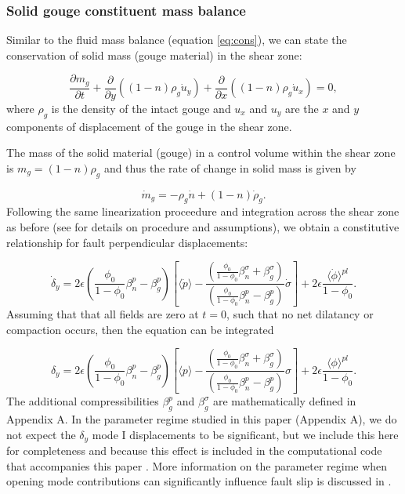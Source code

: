 \documentclass[draft]{agujournal2019}
\begin{document}
\subsubsection{Solid gouge constituent mass balance} \label{sec:solid}

Similar to the fluid mass balance (equation \ref{eq:cons}), we can state the conservation of solid mass (gouge material) in the shear zone:

\begin{equation}
    \frac{\partial m_g}{\partial t} + \frac{\partial}{\partial y} \left(  (1 - n) \rho_g \dot{u}_y \right) +  \frac{\partial}{\partial x} \left(  (1 - n) \rho_g \dot{u}_x \right) = 0,
    \label{eq:conssolid}
\end{equation}
where $\rho_g$ is the density of the intact gouge and $u_x$ and $u_y$ are the $x$ and $y$ components of displacement of the gouge in the shear zone.

The mass of the solid material (gouge) in a control volume within the shear zone is $m_g = (1-n)\rho_g$ and thus the rate of change in solid mass is given by

\begin{equation}
    \dot{m}_g =  - \rho_g \dot{n} + (1-n) \dot{\rho}_g.
\end{equation}
Following the same linearization proceedure and integration across the shear zone as before (see  for details on procedure and assumptions), we obtain a constitutive relationship for fault perpendicular displacements:

\begin{equation}
     \dot{\delta}_y =  2 \epsilon \left( \frac{ \phi_0 }{1 - \phi_0} \beta_n^p - \beta_g^p \right) \left[  \langle \dot{p} \rangle  - \frac{ \left( \frac{ \phi_0 }{1 - \phi_0} \beta_n^{\sigma}  +    \beta_g^\sigma \right)}{\left( \frac{ \phi_0 }{1 - \phi_0} \beta_n^p - \beta_g^p \right)} \dot{\sigma}  \right] + 2 \epsilon \frac{ \langle \dot{\phi} \rangle^{pl}}{1 - \phi_0}.
\end{equation}
Assuming that that all fields are zero at $t=0$, such that no net dilatancy or compaction occurs, then the equation can be integrated

\begin{equation}
     {\delta}_y =  2 \epsilon \left( \frac{ \phi_0 }{1 - \phi_0} \beta_n^p - \beta_g^p \right) \left[  \langle {p} \rangle  - \frac{ \left( \frac{ \phi_0 }{1 - \phi_0} \beta_n^{\sigma}  +    \beta_g^\sigma \right)}{\left( \frac{ \phi_0 }{1 - \phi_0} \beta_n^p - \beta_g^p \right)} {\sigma}  \right] + 2 \epsilon \frac{ \langle {\phi} \rangle^{pl}}{1 - \phi_0}.
     \label{eq:dy}
\end{equation}
The additional compressibilities $\beta_g^p$ and $\beta_g^\sigma$ are mathematically defined in Appendix A.
In the parameter regime studied in this paper (Appendix A), we do not expect the $\delta_y$ mode I displacements to be significant, but we include this here for completeness and because this effect is included in the computational code that accompanies this paper \cite{elias_rafn_heimisson_Poro_SBIM}. More information on the parameter regime when opening mode contributions can significantly influence fault slip is discussed in .
\end{document}

